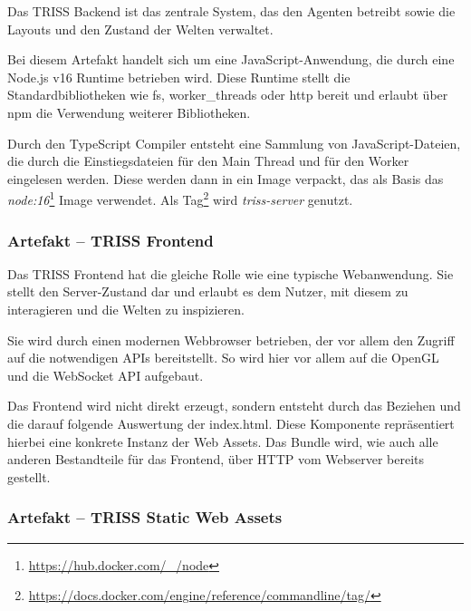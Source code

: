 Das TRISS Backend ist das zentrale System, das den Agenten betreibt sowie die Layouts und den Zustand der Welten verwaltet.


Bei diesem Artefakt handelt sich um eine JavaScript-Anwendung, die durch eine Node.js v16 Runtime betrieben wird.
Diese Runtime stellt die Standardbibliotheken wie fs, worker\_threads oder http bereit und erlaubt über npm die Verwendung weiterer Bibliotheken.


Durch den TypeScript Compiler entsteht eine Sammlung von JavaScript-Dateien, die durch die Einstiegsdateien für den Main Thread und für den Worker eingelesen werden.
Diese werden dann in ein Image verpackt, das als Basis das \textit{node:16}\footnote{\url{https://hub.docker.com/_/node}} Image verwendet.
Als Tag\footnote{\url{https://docs.docker.com/engine/reference/commandline/tag/}} wird \textit{triss-server} genutzt.


\subsubsection{Artefakt – TRISS Frontend}


Das TRISS Frontend hat die gleiche Rolle wie eine typische Webanwendung.
Sie stellt den Server-Zustand dar und erlaubt es dem Nutzer, mit diesem zu interagieren und die Welten zu inspizieren.


Sie wird durch einen modernen Webbrowser betrieben, der vor allem den Zugriff auf die notwendigen APIs bereitstellt.
So wird hier vor allem auf die OpenGL und die WebSocket API aufgebaut.


Das Frontend wird nicht direkt erzeugt, sondern entsteht durch das Beziehen und die darauf folgende Auswertung der index.html.
Diese Komponente repräsentiert hierbei eine konkrete Instanz der Web Assets.
Das Bundle wird, wie auch alle anderen Bestandteile für das Frontend, über HTTP vom Webserver bereits gestellt.

\subsubsection{Artefakt – TRISS Static Web Assets}

